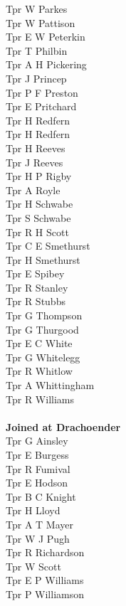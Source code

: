 \begin{multicols}{2}
  Tpr W Parkes \\
  Tpr W Pattison \\
  Tpr E W Peterkin \\
  Tpr T Philbin \\
  Tpr A H Pickering \\
  Tpr J Princep \\
  Tpr P F Preston \\
  Tpr E Pritchard \\
  Tpr H Redfern \\
  Tpr H Redfern \\
  Tpr H Reeves \\
  Tpr J Reeves \\
  Tpr H P Rigby \\
  Tpr A Royle \\
  Tpr H Schwabe \\
  Tpr S Schwabe \\
  Tpr R H Scott \\
  Tpr C E Smethurst \\
  Tpr H Smethurst \\
  Tpr E Spibey \\
  Tpr R Stanley \\
  Tpr R Stubbs \\
  Tpr G Thompson \\
  Tpr G Thurgood \\
  Tpr E C White \\
  Tpr G Whitelegg \\
  Tpr R Whitlow \\
  Tpr A Whittingham \\
  Tpr R Williams \\
  \\
  \textbf{Joined at Drachoender} \\
  Tpr G Ainsley \\
  Tpr E Burgess \\
  Tpr R Fumival \\
  Tpr E Hodson \\
  Tpr B C Knight \\
  Tpr H Lloyd \\
  Tpr A T Mayer \\
  Tpr W J Pugh \\
  Tpr R Richardson \\
  Tpr W Scott \\
  Tpr E P Williams \\
  Tpr P Williamson \\
\end{multicols}
